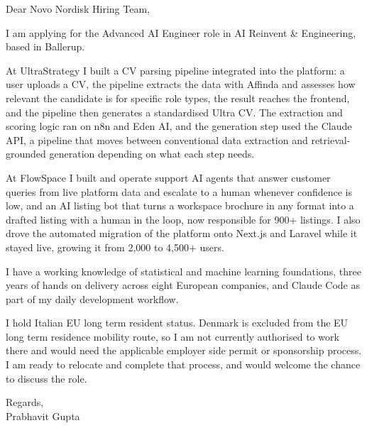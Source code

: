 \documentclass[a4paper,11pt]{article}
\begin{document}
Dear Novo Nordisk Hiring Team,

I am applying for the Advanced AI Engineer role in AI Reinvent \& Engineering, based in Ballerup.

At UltraStrategy I built a CV parsing pipeline integrated into the platform: a user uploads a CV, the pipeline extracts the data with Affinda and assesses how relevant the candidate is for specific role types, the result reaches the frontend, and the pipeline then generates a standardised Ultra CV. The extraction and scoring logic ran on n8n and Eden AI, and the generation step used the Claude API, a pipeline that moves between conventional data extraction and retrieval-grounded generation depending on what each step needs.

At FlowSpace I built and operate support AI agents that answer customer queries from live platform data and escalate to a human whenever confidence is low, and an AI listing bot that turns a workspace brochure in any format into a drafted listing with a human in the loop, now responsible for 900+ listings. I also drove the automated migration of the platform onto Next.js and Laravel while it stayed live, growing it from 2,000 to 4,500+ users.

I have a working knowledge of statistical and machine learning foundations, three years of hands on delivery across eight European companies, and Claude Code as part of my daily development workflow.

I hold Italian EU long term resident status. Denmark is excluded from the EU long term residence mobility route, so I am not currently authorised to work there and would need the applicable employer side permit or sponsorship process. I am ready to relocate and complete that process, and would welcome the chance to discuss the role.

Regards,\\
Prabhavit Gupta
\end{document}
